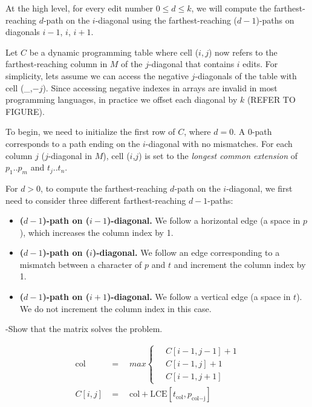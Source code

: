 At the high level, for every edit number $0 \leq d \leq k$, we will compute the farthest-reaching $d$-path on the $i$-diagonal using the farthest-reaching ($d-1$)-paths on diagonals $i-1$, $i$, $i+1$.

Let $C$ be a dynamic programming table where cell ($i,j$) now refers to the farthest-reaching column in $M$ of the $j$-diagonal that contains $i$ edits.
For simplicity, lets assume we can access the negative $j$-diagonals of the table with cell (\_,$-j$).
Since accessing negative indexes in arrays are invalid in most programming languages, in practice we offset each diagonal by $k$ (REFER TO FIGURE).

To begin, we need to initialize the first row of $C$, where $d=0$.
A $0$-path corresponds to a path ending on the $i$-diagonal with no mismatches.
For each column $j$ ($j$-diagonal in $M$), cell ($i$,$j$) is set to the \emph{longest common extension} of $p_1..p_m$ and $t_j..t_n$.

For $d > 0$, to compute the farthest-reaching $d$-path on the $i$-diagonal, we first need to consider three different farthest-reaching $d-1$-paths:

\begin{itemize}
  \item {\bf ($d-1$)-path on ($i-1$)-diagonal.} We follow a horizontal edge (a space in $p$), which increases the column index by 1.
  \item {\bf ($d-1$)-path on ($i$)-diagonal.} We follow an edge corresponding to a mismatch between a character of $p$ and $t$ and increment the column index by 1.
  \item {\bf ($d-1$)-path on ($i+1$)-diagonal.} We follow a vertical edge (a space in $t$).  We do not increment the column index in this case.
\end{itemize}

-Show that the matrix solves the problem.


\begin{equation}
\begin{aligned}
\text{col} & = \quad max
\begin{cases}
\quad C[i - 1, j-1] + 1 \\
\quad C[i - 1, j] + 1 \\
\quad C[i - 1, j+1] 
\end{cases} \\
C[i, j] & =  \quad \text{col} + \text{LCE}[t_{\text{col}}, p_{\text{col} - \text{j}}]
\end{aligned}
\end{equation}

